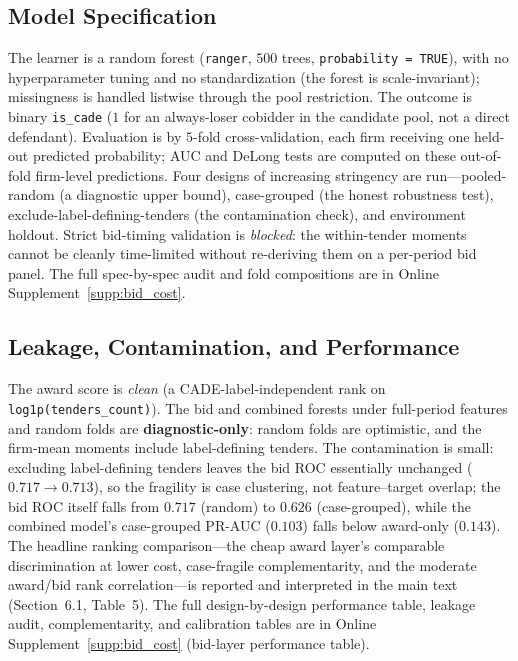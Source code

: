 \subsection{Model Specification}
\label{app:bid_model_submission}

The learner is a random forest (\texttt{ranger}, $500$ trees,
\texttt{probability = TRUE}), with no hyperparameter tuning and no
standardization (the forest is scale-invariant); missingness is handled
listwise through the pool restriction. The outcome is binary
\texttt{is\_cade} ($1$ for an always-loser cobidder in the candidate pool,
not a direct defendant). Evaluation is by $5$-fold cross-validation, each
firm receiving one held-out predicted probability; AUC and DeLong tests are
computed on these out-of-fold firm-level predictions. Four designs of
increasing stringency are run---pooled-random (a diagnostic upper bound),
case-grouped (the honest robustness test), exclude-label-defining-tenders
(the contamination check), and environment holdout. Strict bid-timing
validation is \emph{blocked}: the within-tender moments cannot be cleanly
time-limited without re-deriving them on a per-period bid panel. The full
spec-by-spec audit and fold compositions are in Online Supplement~\ref{supp:bid_cost}.

\subsection{Leakage, Contamination, and Performance}
\label{app:bid_perf_submission}

The award score is \emph{clean} (a CADE-label-independent rank on
\texttt{log1p(tenders\_count)}). The bid and combined forests under
full-period features and random folds are \textbf{diagnostic-only}: random
folds are optimistic, and the firm-mean moments include label-defining
tenders. The contamination is small: excluding label-defining tenders
leaves the bid ROC essentially unchanged ($0.717 \to 0.713$), so the
fragility is case clustering, not feature--target overlap; the bid ROC
itself falls from $0.717$ (random) to $0.626$ (case-grouped), while the
combined model's case-grouped PR-AUC ($0.103$) falls below award-only
($0.143$). The headline ranking comparison---the cheap award layer's
comparable discrimination at lower cost, case-fragile complementarity, and
the moderate award/bid rank correlation---is reported and interpreted in
the main text (Section~6.1, Table~5). The full design-by-design
performance table, leakage audit, complementarity, and calibration tables
are in Online Supplement~\ref{supp:bid_cost} (bid-layer performance table).

